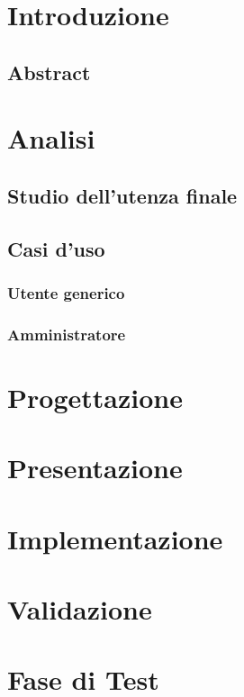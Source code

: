 \documentclass[a4paper, oneside, openany, dvipsnames, table]{article}
\begin{document}
\copertina
\tableofcontents
\newpage
\section{Introduzione}
	
	\subsection{Abstract}
		
	
\newpage
\section{Analisi}
	
	\subsection{Studio dell'utenza finale}
		
	\subsection{Casi d'uso}
		
		\subsubsection{Utente generico}
			
		\subsubsection{Amministratore}
			

\newpage
\section{Progettazione}

\newpage
\section{Presentazione}

\newpage
\section{Implementazione}


\newpage
\section{Validazione}


\newpage
\section{Fase di Test}
\end{document}
